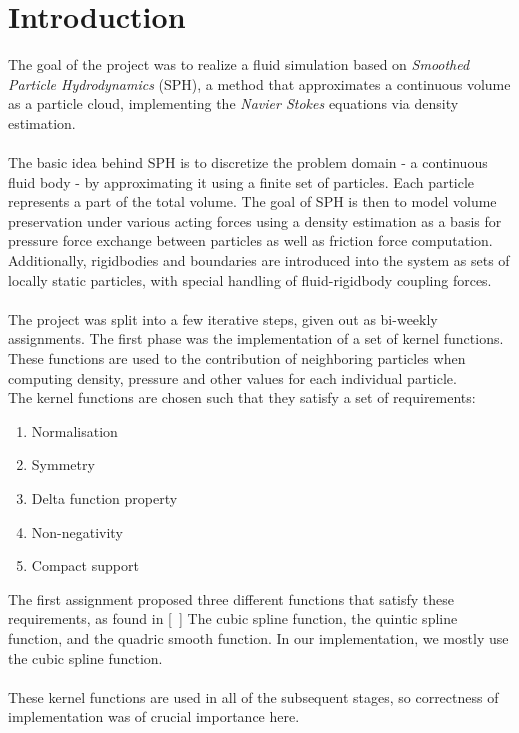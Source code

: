 \documentclass{ACGSeminar}
\begin{document}
\section{Introduction}
The goal of the project was to realize a fluid simulation based on \textit{Smoothed Particle Hydrodynamics} (SPH), a method that approximates a continuous volume as a particle cloud, implementing the \textit{Navier Stokes} equations via density estimation.\\
\\
The basic idea behind SPH is to discretize the problem domain - a continuous fluid body - by approximating it using a finite set of particles. Each particle represents a part of the total volume. The goal of SPH is then to model volume preservation under various acting forces using a density estimation as a basis for pressure force exchange between particles as well as friction force computation. Additionally, rigidbodies and boundaries are introduced into the system as sets of locally static particles, with special handling of fluid-rigidbody coupling forces. \\
\\
The project was split into a few iterative steps, given out as bi-weekly assignments.
The first phase was the implementation of a set of kernel functions. These functions are used to the contribution of neighboring particles when computing density, pressure and other values for each individual particle. \\
The kernel functions are chosen such that they satisfy a set of requirements:\\
\begin{enumerate}
\item Normalisation 
\item Symmetry 
\item Delta function property 
\item Non-negativity 
\item Compact support
\end{enumerate}
The first assignment proposed three different functions that satisfy these requirements, as found in [~\cite{Liu}] The cubic spline function, the quintic spline function, and the quadric smooth function.
In our implementation, we mostly use the cubic spline function.\\
\\
These kernel functions are used in all of the subsequent stages, so correctness of implementation was of crucial importance here.\\
\\
\end{document}
